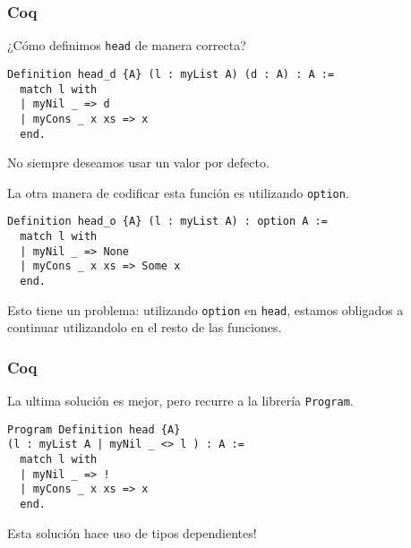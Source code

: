 \documentclass{beamer}
\begin{document}

\begin{frame}[fragile]
\frametitle{Coq}

¿Cómo definimos \lstinline{head} de manera correcta?

\pause
\begin{lstlisting}
Definition head_d {A} (l : myList A) (d : A) : A :=
  match l with
  | myNil _ => d
  | myCons _ x xs => x
  end.
\end{lstlisting}

\pause
No siempre deseamos usar un valor por defecto.

\pause
La otra manera de codificar esta función es utilizando \lstinline{option}.

\pause
\begin{lstlisting}
Definition head_o {A} (l : myList A) : option A :=
  match l with
  | myNil _ => None
  | myCons _ x xs => Some x
  end.
\end{lstlisting}

Esto tiene un problema: utilizando \lstinline{option} en \lstinline{head}, estamos obligados a continuar utilizandolo en el resto de las funciones.

\end{frame}

\begin{frame}[fragile]
\frametitle{Coq}

La ultima solución es mejor, pero recurre a la librería \lstinline{Program}.

\pause
\begin{lstlisting}
Program Definition head {A}
(l : myList A | myNil _ <> l ) : A :=
  match l with
  | myNil _ => !
  | myCons _ x xs => x
  end.
\end{lstlisting}

\pause
Esta solución hace uso de tipos dependientes!
\end{frame}
\end{document}
